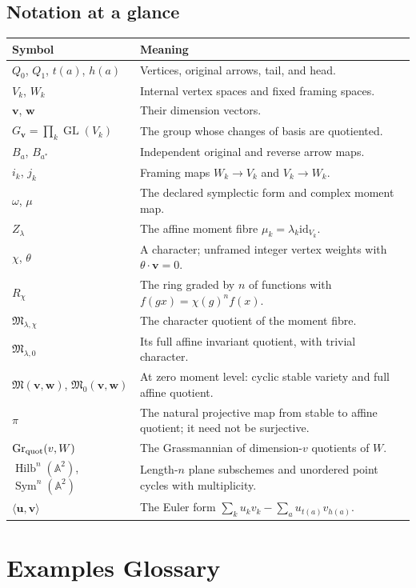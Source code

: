 \documentclass[11pt,a4paper]{article}
\numberwithin{equation}{section}
\theoremstyle{definition}
\newcommand{\A}{\mathbb A}
\newcommand{\GL}{\operatorname{GL}}
\newcommand{\Gr}{\operatorname{Gr}}
\newcommand{\Hilb}{\operatorname{Hilb}}
\newcommand{\Sym}{\operatorname{Sym}}
\newcommand{\id}{\mathrm{id}}
\newcommand{\M}{\mathfrak M}
\newcommand{\vv}{\mathbf v}
\newcommand{\ww}{\mathbf w}
\begin{document}
\subsection*{Notation at a glance}
\begin{longtable}{@{}p{}p{}@{}}
\toprule Symbol & Meaning\\\midrule\endhead
$Q_0$, $Q_1$, $t(a)$, $h(a)$ & Vertices, original arrows, tail, and head.\\
$V_k$, $W_k$ & Internal vertex spaces and fixed framing spaces.\\
$\vv$, $\ww$ & Their dimension vectors.\\
$G_\vv=\prod_k\GL(V_k)$ & The group whose changes of basis are quotiented.\\
$B_a$, $B_{a^*}$ & Independent original and reverse arrow maps.\\
$i_k$, $j_k$ & Framing maps $W_k\to V_k$ and $V_k\to W_k$.\\
$\omega$, $\mu$ & The declared symplectic form and complex moment map.\\
$Z_\lambda$ & The affine moment fibre $\mu_k=\lambda_k\id_{V_k}$.\\
$\chi$, $\theta$ & A character; unframed integer vertex weights with $\theta\cdot\vv=0$.\\
$R_\chi$ & The ring graded by $n$ of functions with $f(gx)=\chi(g)^nf(x)$.\\
$\M_{\lambda,\chi}$ & The character quotient of the moment fibre.\\
$\M_{\lambda,0}$ & Its full affine invariant quotient, with trivial character.\\
$\M(\vv,\ww)$, $\M_0(\vv,\ww)$ & At zero moment level: cyclic stable variety and full affine quotient.\\
$\pi$ & The natural projective map from stable to affine quotient; it need not be surjective.\\
$\Gr_{\rm quot}(v,W)$ & The Grassmannian of dimension-$v$ quotients of $W$.\\
$\Hilb^n(\A^2)$, $\Sym^n(\A^2)$ & Length-$n$ plane subschemes and unordered point cycles with multiplicity.\\
$\langle\mathbf u,\mathbf v\rangle$ & The Euler form $\sum_ku_kv_k-\sum_a u_{t(a)}v_{h(a)}$.\\
\bottomrule
\end{longtable}

\clearpage
\section{Examples Glossary}
\label{app:examples-glossary}
\end{document}

